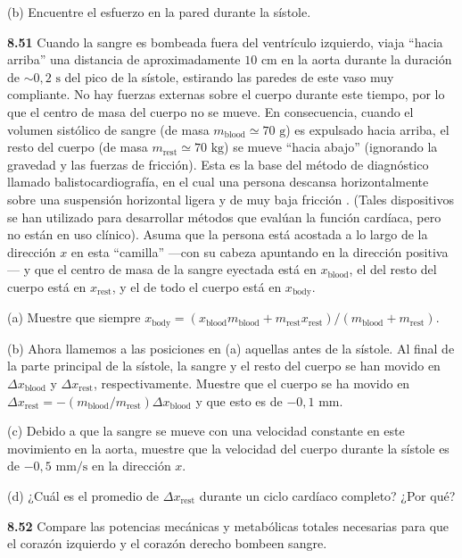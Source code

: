 \documentclass[12pt]{book}
\begin{document}
(b) Encuentre el esfuerzo en la pared durante la sístole.

\textbf{8.51} Cuando la sangre es bombeada fuera del ventrículo izquierdo, viaja ``hacia arriba'' una distancia de aproximadamente $10\text{ cm}$ en la aorta durante la duración de ${\sim}0{,}2\text{ s}$ del pico de la sístole, estirando las paredes de este vaso muy compliante. No hay fuerzas externas sobre el cuerpo durante este tiempo, por lo que el centro de masa del cuerpo no se mueve. En consecuencia, cuando el volumen sistólico de sangre (de masa $m_{\text{blood}} \simeq 70\text{ g}$) es expulsado hacia arriba, el resto del cuerpo (de masa $m_{\text{rest}} \simeq 70\text{ kg}$) se mueve ``hacia abajo'' (ignorando la gravedad y las fuerzas de fricción). Esta es la base del método de diagnóstico llamado balistocardiografía, en el cual una persona descansa horizontalmente sobre una suspensión horizontal ligera y de muy baja fricción \cite{4}. (Tales dispositivos se han utilizado para desarrollar métodos que evalúan la función cardíaca, pero no están en uso clínico). Asuma que la persona está acostada a lo largo de la dirección $x$ en esta ``camilla'' ---con su cabeza apuntando en la dirección positiva--- y que el centro de masa de la sangre eyectada está en $x_{\text{blood}}$, el del resto del cuerpo está en $x_{\text{rest}}$, y el de todo el cuerpo está en $x_{\text{body}}$.

(a) Muestre que siempre $x_{\text{body}} = (x_{\text{blood}} m_{\text{blood}} + m_{\text{rest}} x_{\text{rest}})/(m_{\text{blood}} + m_{\text{rest}})$.

(b) Ahora llamemos a las posiciones en (a) aquellas antes de la sístole. Al final de la parte principal de la sístole, la sangre y el resto del cuerpo se han movido en $\Delta x_{\text{blood}}$ y $\Delta x_{\text{rest}}$, respectivamente. Muestre que el cuerpo se ha movido en $\Delta x_{\text{rest}} = - (m_{\text{blood}}/m_{\text{rest}}) \Delta x_{\text{blood}}$ y que esto es de $-0{,}1\text{ mm}$.

(c) Debido a que la sangre se mueve con una velocidad constante en este movimiento en la aorta, muestre que la velocidad del cuerpo durante la sístole es de $-0{,}5\text{ mm/s}$ en la dirección $x$.

(d) ¿Cuál es el promedio de $\Delta x_{\text{rest}}$ durante un ciclo cardíaco completo? ¿Por qué?

\textbf{8.52} Compare las potencias mecánicas y metabólicas totales necesarias para que el corazón izquierdo y el corazón derecho bombeen sangre.
\end{document}
